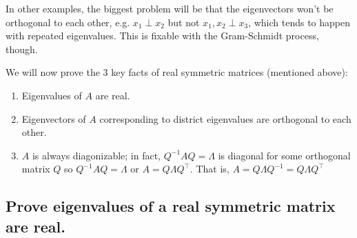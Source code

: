 In other examples, the biggest problem will be that the eigenvectors won't be orthogonal to each other, e.g. $x_1 \perp x_2 $ but not $x_1, x_2 \perp x_3$, which tends to happen with repeated eigenvalues. This is fixable with the Gram-Schmidt process, though.

We will now prove the 3 key facts of real symmetric matrices (mentioned above):
\begin{enumerate}
  \item Eigenvalues of $A$ are real.
  \item Eigenvectors of $A$ corresponding to district eigenvalues are orthogonal to each other.
  \item $A$ is always diagonizable; in fact, $Q^{-1}AQ=\Lambda$ is diagonal for some orthogonal matrix $Q$ so $Q^{-1}AQ=\Lambda$ or $A=Q \Lambda Q^\intercal$. That is, $A=Q \Lambda Q^{-1}=Q \Lambda Q^\intercal$
\end{enumerate}

\subsection{Prove eigenvalues of a real symmetric matrix are real.}

